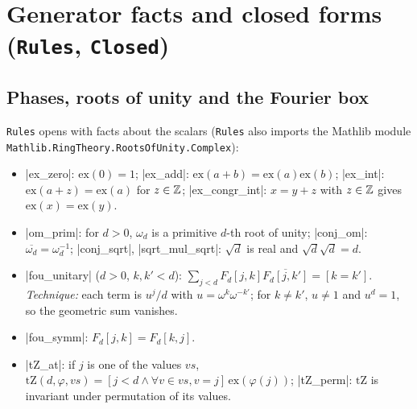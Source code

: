 \section{Generator facts and closed forms (\texttt{Rules}, \texttt{Closed})}\label{sec:lean-core-closed}

\subsection{Phases, roots of unity and the Fourier box}

\texttt{Rules} opens with facts about the scalars (\texttt{Rules} also imports
the Mathlib module \nolinkurl{Mathlib.RingTheory.RootsOfUnity.Complex}):
\begin{itemize}
\item \lean|ex_zero|: $\mathrm{ex}(0)=1$; \lean|ex_add|: $\mathrm{ex}(a+b)=\mathrm{ex}(a)\mathrm{ex}(b)$;
  \lean|ex_int|: $\mathrm{ex}(a+z)=\mathrm{ex}(a)$ for $z\in\mathbb{Z}$; \lean|ex_congr_int|: $x=y+z$ with
  $z\in\mathbb{Z}$ gives $\mathrm{ex}(x)=\mathrm{ex}(y)$.
\item \lean|om_prim|: for $d>0$, $\omega_d$ is a primitive $d$-th root of unity; \lean|conj_om|:
  $\overline{\omega_d}=\omega_d^{-1}$; \lean|conj_sqrt|, \lean|sqrt_mul_sqrt|: $\sqrt d$ is real and
  $\sqrt d\sqrt d=d$.
\item \lean|fou_unitary| ($d>0$, $k,k'<d$): $\sum_{j<d}F_d[j,k]\overline{F_d[j,k']}=[k=k']$.
  \emph{Technique:} each term is $u^j/d$ with $u=\omega^k\omega^{-k'}$; for $k\ne k'$, $u\ne1$ and
  $u^d=1$, so the geometric sum vanishes.
\item \lean|fou_symm|: $F_d[j,k]=F_d[k,j]$.
\item \lean|tZ_at|: if $j$ is one of the values $vs$, $\mathrm{tZ}(d,\varphi,vs)=[j<d\land\forall v\in vs,
  v=j]\,\mathrm{ex}(\varphi(j))$; \lean|tZ_perm|: $\mathrm{tZ}$ is invariant under permutation of its
  values.
\end{itemize}

